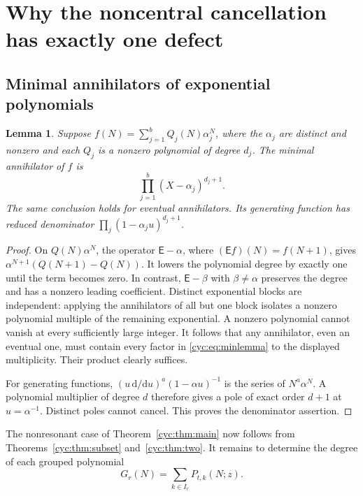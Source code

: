 \documentclass[11pt,a4paper]{article}
\numberwithin{equation}{section}
\newtheorem{lemma}[theorem]{Lemma}
\theoremstyle{definition}
\theoremstyle{remark}
\newcommand{\dd}{\mathrm d}
\newcommand{\E}{\mathsf E}
\begin{document}
\section{Why the noncentral cancellation has exactly one defect}\label{cyc:sec:proofmain}

\subsection{Minimal annihilators of exponential polynomials}
\begin{lemma}\label{cyc:lem:minimal}
Suppose $f(N)=\sum_{j=1}^{b}Q_j(N)\alpha_j^N$, where the
$\alpha_j$ are distinct and nonzero and each $Q_j$ is a nonzero
polynomial of degree $d_j$.  The minimal annihilator of $f$ is
\begin{equation}\label{cyc:eq:minlemma}
 \prod_{j=1}^{b}(X-\alpha_j)^{d_j+1}.
\end{equation}
The same conclusion holds for eventual annihilators.  Its generating
function has reduced denominator $\prod_j(1-\alpha_j u)^{d_j+1}$.
\end{lemma}
\begin{proof}
On $Q(N)\alpha^N$, the operator $\E-\alpha$, where
$(\E f)(N)=f(N+1)$, gives
$\alpha^{N+1}(Q(N+1)-Q(N))$.  It lowers the polynomial degree by
exactly one until the term becomes zero.  In contrast, $\E-\beta$
with $\beta\ne\alpha$ preserves the degree and has a nonzero leading
coefficient.  Distinct exponential blocks are independent: applying
the annihilators of all but one block isolates a nonzero polynomial
multiple of the remaining exponential.  A nonzero polynomial cannot
vanish at every sufficiently large integer.  It follows that any
annihilator, even an eventual one, must contain every factor in
\eqref{cyc:eq:minlemma} to the displayed multiplicity.  Their product
clearly suffices.

For generating functions, $(u\,\dd/\dd u)^a(1-\alpha u)^{-1}$
is the series of $N^a\alpha^N$.  A polynomial multiplier of degree
$d$ therefore gives a pole of exact order $d+1$ at $u=\alpha^{-1}$.
Distinct poles cannot cancel.  This proves the denominator assertion.
\end{proof}


The nonresonant case of Theorem~\ref{cyc:thm:main} now follows from
Theorems~\ref{cyc:thm:subset} and~\ref{cyc:thm:two}.  It remains to determine
the degree of each grouped polynomial
\begin{equation}\label{cyc:eq:groupP}
 G_r(N)=\sum_{k\in I_r}P_{t,k}(N;z).
\end{equation}
\end{document}
